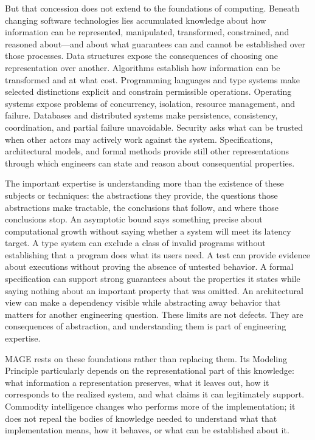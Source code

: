 But that concession does not extend to the foundations of computing. Beneath changing software technologies lies accumulated knowledge about how information can be represented, manipulated, transformed, constrained, and reasoned about---and about what guarantees can and cannot be established over those processes. Data structures expose the consequences of choosing one representation over another. Algorithms establish how information can be transformed and at what cost. Programming languages and type systems make selected distinctions explicit and constrain permissible operations. Operating systems expose problems of concurrency, isolation, resource management, and failure. Databases and distributed systems make persistence, consistency, coordination, and partial failure unavoidable. Security asks what can be trusted when other actors may actively work against the system. Specifications, architectural models, and formal methods provide still other representations through which engineers can state and reason about consequential properties.


The important expertise is understanding more than the existence of these subjects or techniques: the abstractions they provide, the questions those abstractions make tractable, the conclusions that follow, and where those conclusions stop. An asymptotic bound says something precise about computational growth without saying whether a system will meet its latency target. A type system can exclude a class of invalid programs without establishing that a program does what its users need. A test can provide evidence about executions without proving the absence of untested behavior. A formal specification can support strong guarantees about the properties it states while saying nothing about an important property that was omitted. An architectural view can make a dependency visible while abstracting away behavior that matters for another engineering question. These limits are not defects. They are consequences of abstraction, and understanding them is part of engineering expertise.


MAGE rests on these foundations rather than replacing them. Its Modeling Principle particularly depends on the representational part of this knowledge: what information a representation preserves, what it leaves out, how it corresponds to the realized system, and what claims it can legitimately support. Commodity intelligence changes who performs more of the implementation; it does not repeal the bodies of knowledge needed to understand what that implementation means, how it behaves, or what can be established about it.

